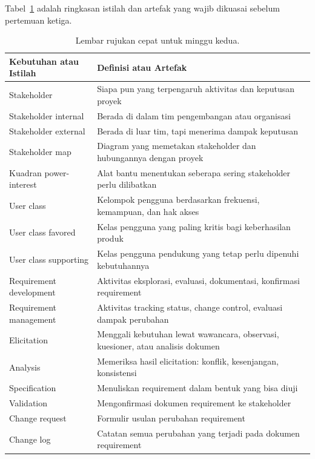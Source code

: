 \documentclass[11pt,a4paper]{article}
\begin{document}
Tabel~\ref{tab:cheat} adalah ringkasan istilah dan artefak yang wajib dikuasai sebelum pertemuan ketiga.

\begin{table}[H]
	\centering
	\caption{Lembar rujukan cepat untuk minggu kedua.}
	\label{tab:cheat}
	\footnotesize
	\begin{tabularx}{\textwidth}{l X}
		\toprule
		Kebutuhan atau Istilah  & Definisi atau Artefak                                                           \\
		\midrule
		Stakeholder             & Siapa pun yang terpengaruh aktivitas dan keputusan proyek                       \\
		Stakeholder internal    & Berada di dalam tim pengembangan atau organisasi                                \\
		Stakeholder external    & Berada di luar tim, tapi menerima dampak keputusan                              \\
		Stakeholder map         & Diagram yang memetakan stakeholder dan hubungannya dengan proyek                \\
		Kuadran power-interest  & Alat bantu menentukan seberapa sering stakeholder perlu dilibatkan              \\
		User class              & Kelompok pengguna berdasarkan frekuensi, kemampuan, dan hak akses               \\
		User class favored      & Kelas pengguna yang paling kritis bagi keberhasilan produk                      \\
		User class supporting   & Kelas pengguna pendukung yang tetap perlu dipenuhi kebutuhannya                 \\
		Requirement development & Aktivitas eksplorasi, evaluasi, dokumentasi, konfirmasi requirement             \\
		Requirement management  & Aktivitas tracking status, change control, evaluasi dampak perubahan            \\
		Elicitation             & Menggali kebutuhan lewat wawancara, observasi, kuesioner, atau analisis dokumen \\
		Analysis                & Memeriksa hasil elicitation: konflik, kesenjangan, konsistensi                  \\
		Specification           & Menuliskan requirement dalam bentuk yang bisa diuji                             \\
		Validation              & Mengonfirmasi dokumen requirement ke stakeholder                                \\
		Change request          & Formulir usulan perubahan requirement                                           \\
		Change log              & Catatan semua perubahan yang terjadi pada dokumen requirement                   \\
		\bottomrule
	\end{tabularx}
\end{table}
\end{document}
